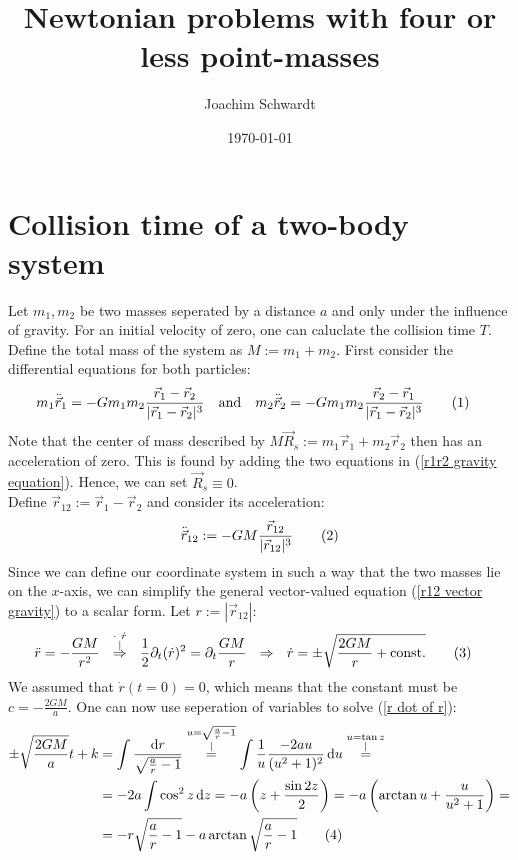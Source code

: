 \documentclass[a4paper,12pt]{article}
\newcommand\numberthis{\addtocounter{equation}{1}\tag{\theequation}}
\newcommand{\kom}{}
\newcommand{\kla}{}
\newcommand{\tecxt}{}
\begin{document}
\title{Newtonian problems with four or less point-masses}
\author{Joachim Schwardt}
\date{\today}
\maketitle

\section{Collision time of a two-body system}
Let $m_1,m_2$ be two masses seperated by a distance $a$ and only under the influence of gravity. For an initial velocity of zero, one can caluclate the collision time $T$. Define the total mass of the system as $M:=m_1+m_2$. First consider the differential equations for both particles:
\begin{align*}
m_1\ddot{\vec{r}}_1&=-Gm_1m_2\frac{\vec{r}_1-\vec{r}_2}{|\vec{r}_1-\vec{r}_2|^3}&\tecxt\text{and}&&m_2\ddot{\vec{r}}_2&=-Gm_1m_2\frac{\vec{r}_2-\vec{r}_1}{|\vec{r}_1-\vec{r}_2|^3}\numberthis\label{r1r2 gravity equation}
\end{align*}
Note that the center of mass described by $M\vec{R}_s:=m_1\vec{r}_1+m_2\vec{r}_2$ then has an acceleration of zero. This is found by adding the two equations in (\ref{r1r2 gravity equation}). Hence, we can set $\vec{R}_s\equiv 0$. \\
Define $\vec{r}_{12}:=\vec{r}_{1}-\vec{r}_{2}$ and consider its acceleration:
\begin{align*}
\ddot{\vec{r}}_{12}:=-GM\frac{\vec{r}_{12}}{|\vec{r}_{12}|^3}\numberthis\label{r12 vector gravity}
\end{align*}
Since we can define our coordinate system in such a way that the two masses lie on the $x$-axis, we can simplify the general vector-valued equation (\ref{r12 vector gravity}) to a scalar form. Let $r:=|\vec{r}_{12}|$:
\begin{align*}
\ddot{r}&=-\frac{GM}{r^2}\ \ \kom\overset{\substack{{\cdot\ \dot{r}} \\ |}}{\Rightarrow}\ \ \frac{1}{2}\partial_t(\dot{r})^2=\partial_t\frac{GM}{r}\ \ \Rightarrow\ \ \dot{r}=\pm\sqrt{\frac{2GM}{r}+\tecxt\text{const.}}\numberthis\label{r dot of r}
\end{align*}
We assumed that $\dot{r}(t=0)=0$, which means that the constant must be $c=-\frac{2GM}{a}$. One can now use seperation of variables to solve (\ref{r dot of r}):
\begin{align*}
\pm\sqrt{\frac{2GM}{a}}t+k&=\int\frac{\tecxt\text{d}r}{\sqrt{\frac{a}{r}-1}}\kom\overset{\substack{{u=\sqrt{\frac{a}{r}-1}} \\ |}}{=}\int\frac{1}{u}\frac{-2au}{(u^2+1)^2}\,\tecxt\text{d}u\kom\overset{\substack{{u=\tan z} \\ |}}{=}\\
&=-2a\int\cos^2z\,\tecxt\text{d}z=-a\kla\left( {z+\frac{\sin 2z}{2}} \right)=-a\kla\left( {\arctan u+\frac{u}{u^2+1}} \right)=\\
&=-r\sqrt{\frac{a}{r}-1}-a\arctan\sqrt{\frac{a}{r}-1}\numberthis\label{r of t implicit}
\end{align*}
\end{document}
